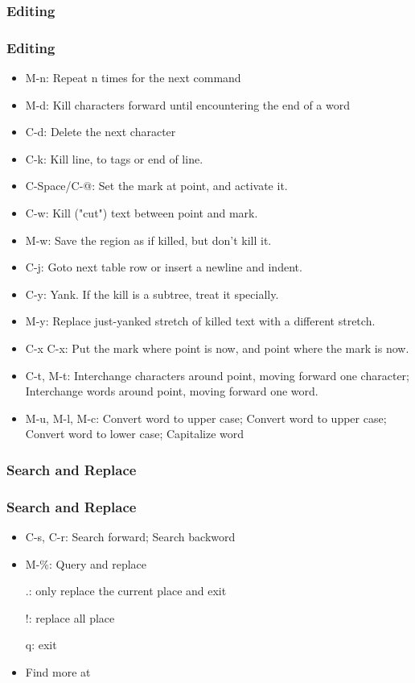 \subsubsection{Editing}
\begin{frame}[allowframebreaks]
\frametitle{Editing}
    \begin{itemize}
        \item M-n: Repeat n times for the next command
        \item M-d: Kill characters forward until encountering the end of a word
        \item C-d: Delete the next character
        \item C-k: Kill line, to tags or end of line.
        \item C-Space/C-@: Set the mark at point, and activate it.
        \item C-w: Kill ("cut") text between point and mark.
        \item M-w: Save the region as if killed, but don't kill it.
        \item C-j: Goto next table row or insert a newline and indent.
        \item C-y: Yank.  If the kill is a subtree, treat it specially.
        \item M-y: Replace just-yanked stretch of killed text with a different stretch.
        \item C-x C-x: Put the mark where point is now, and point where the mark is now.
        \item C-t, M-t: Interchange characters around point, moving forward one character; Interchange words around point, moving forward one word.
        \item M-u, M-l, M-c: Convert word to upper case; Convert word to upper case; Convert word to lower case; Capitalize word
    \end{itemize}
\end{frame}
\subsubsection{Search and Replace}
\begin{frame}
\frametitle{Search and Replace}
    \begin{itemize}
        \item C-s, C-r: Search forward; Search backword
        \item M-\%: Query and replace

        .: only replace the current place and exit

        !: replace all place

        q: exit
        \item Find more at \href{http://kongll.github.io/2014/10/30/Emacs-keys/}{}
    \end{itemize}
\end{frame}
